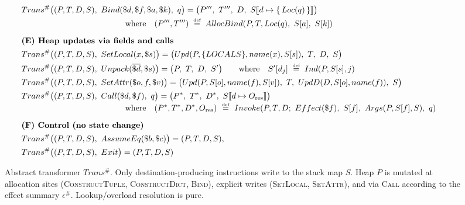 \begin{figure*}[t]
\begin{align*}
\\[0.25em]
&Trans^\#\big((P,T,D,S),\ Bind(\$d,\$f,\$a,\$k),\ q\big)
  = \big(P''',\ T''',\ D,\ S\llbracket d \mapsto \{\,Loc(q)\,\}\rrbracket\big)
\\[-0.1em]
&\hspace{4.45cm}\text{where}\quad (P''',T''') \;\defeq\; AllocBind(P,T,Loc(q),\ S[a],\ S[k])
\\[0.6em]
&\textbf{(E) Heap updates via fields and calls}\\
&Trans^\#\big((P,T,D,S),\ SetLocal(x,\$s)\big)
  = \big(Upd(P,\{LOCALS\},name(x),S[s]),\ T,\ D,\ S\big) \\
&Trans^\#\big((P,T,D,S),\ Unpack(\overline{\$d},\$s)\big)
  = \big(P,\ T,\ D,\ S'\big)
\qquad\text{where}\quad
S'[d_j] \;\defeq\; Ind(P,S[s],j) \\
&Trans^\#\big((P,T,D,S),\ SetAttr(\$o,f,\$v)\big)
  = \big(Upd(P,S[o],name(f),S[v]),\ T,\ UpdD(D,S[o],name(f)),\ S\big)
\\
&Trans^\#\big((P,T,D,S),\ Call(\$d,\$f),\ q\big)
  = \big(P^\ast,\ T^\ast,\ D^\ast,\ S\llbracket d \mapsto O_{\mathrm{res}}\rrbracket\big)
\\[-0.3em]
&\hspace{4.45cm}\text{where}\quad (P^\ast,T^\ast,D^\ast,O_{\mathrm{res}})\ \defeq\ Invoke(P,T,D;\ Effect(\$f),\ S[f],\ Args(P,S[f],S),\ q)
\\[0.6em]
&\textbf{(F) Control (no state change)}\\
&Trans^\#\big((P,T,D,S),\ AssumeEq(\$b,\$c)\big)=(P,T,D,S),
\\
&Trans^\#\big((P,T,D,S),\ Exit\big)=(P,T,D,S)
\end{align*}

\caption{Abstract transformer \(Trans^\#\).
Only destination-producing instructions write to the stack map \(S\).
Heap \(P\) is mutated at allocation sites (\textsc{ConstructTuple}, \textsc{ConstructDict}, \textsc{Bind}), explicit writes (\textsc{SetLocal}, \textsc{SetAttr}), and via \textsc{Call} according to the effect summary \(\epsilon^\#\).
Lookup/overload resolution is pure.}
\label{fig:tac-transfers}
\end{figure*}

